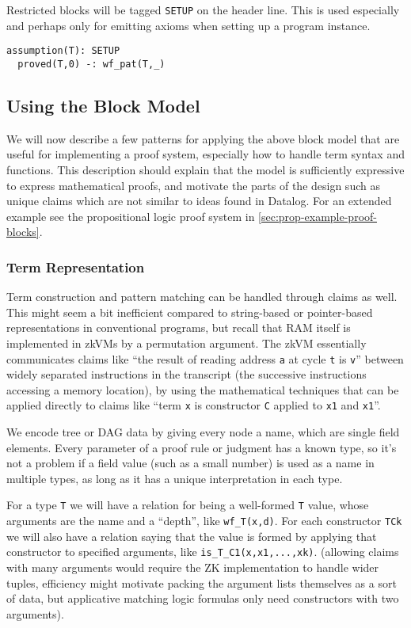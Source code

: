 \documentclass{article}
\theoremstyle{plain}
\theoremstyle{definition}
\begin{document}
Restricted blocks will be tagged \texttt{SETUP} on the header line. This
is used especially and perhaps only for emitting axioms when setting up
a program instance.

\begin{verbatim}
assumption(T): SETUP
  proved(T,0) -: wf_pat(T,_)
\end{verbatim}

\subsection{Using the Block Model}\label{using-the-block-model}

We will now describe a few patterns for applying the above block model
that are useful for implementing a proof system, especially how to
handle term syntax and functions.
This description should explain that the model is sufficiently expressive
to express mathematical proofs, and motivate the parts of the design such
as unique claims which are not similar to ideas found in Datalog.
For an extended example see the
propositional logic proof system in \cref{sec:prop-example-proof-blocks}.

\subsubsection{Term Representation}\label{term-representation}

Term construction and pattern matching can be handled through claims as
well. This might seem a bit inefficient compared to string-based or
pointer-based representations in conventional programs, but recall that
RAM itself is implemented in zkVMs by a permutation argument.
The zkVM essentially communicates claims like ``the result of reading address
\texttt{a} at cycle \texttt{t} is \texttt{v}'' between widely separated
instructions in the transcript (the successive instructions accessing
a memory location), by using the mathematical techniques that
can be applied directly to claims like ``term
\texttt{x} is constructor \texttt{C} applied to \texttt{x1} and
\texttt{x1}''.

We encode tree or DAG data by giving every node a name,
which are single field elements.
Every parameter of a proof rule or judgment has a known type, so it's
not a problem if a field value (such as a small number) is used as a
name in multiple types, as long as it has a unique interpretation in
each type.

For a type \texttt{T} we will have a relation for being a well-formed
\texttt{T} value, whose arguments are the name and a ``depth'', like
\texttt{wf\_T(x,d)}. For each constructor \texttt{TCk} we will also have
a relation saying that the value is formed by applying that constructor to
specified arguments, like \texttt{is\_T\_C1(x,x1,...,xk)}. (allowing
claims with many arguments would require the ZK implementation to
handle wider tuples, efficiency might motivate packing the argument lists
themselves as a sort of data, but applicative matching logic formulas
only need constructors with two arguments).
\end{document}
